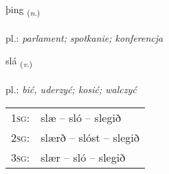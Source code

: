 \documentclass[frontgrid, backgrid]{flacards}\usepackage[]{graphicx}\usepackage[]{xcolor}
\begin{document}
\renewcommand{\flhead}{\vskip5pt \fboxsep=0pt {\small\bfseries\footnotesize Nafnorð | rzeczownik}}
\renewcommand{\fcfoot}{\vskip5pt \fboxsep=0pt \hspace{2pt}{\small\bfseries\footnotesize 1K}}

\renewcommand{\blhead}{\vskip5pt {\small\bfseries\footnotesize Nafnorð | rzeczownik }}
\renewcommand{\bcfoot}{\vskip5pt \hspace{2pt}{\small\bfseries\footnotesize 1K}}


{þing \small{\textsubscript{(\textit{n.})}} \\[1ex] %
\textphonetic{[θiŋk]} \\
pl.: \emph{parlament; spotkanie; konferencja} \\  [2ex]
\renewcommand*{\arraystretch}{0.8}
}

\renewcommand{\flhead}{\vskip5pt \fboxsep=0pt {\small\bfseries\footnotesize Sagnorð | czasownik}}
\renewcommand{\fcfoot}{\vskip5pt \fboxsep=0pt \hspace{2pt}{\small\bfseries\footnotesize 1K}}

\renewcommand{\blhead}{\vskip5pt {\small\bfseries\footnotesize Sagnorð | czasownik }}
\renewcommand{\bcfoot}{\vskip5pt \hspace{2pt}{\small\bfseries\footnotesize 1K}}


{slá \small{\textsubscript{(\textit{v.})}} \\[1ex] %
\textphonetic{[stlauː]} \\
pl.: \emph{bić, uderzyć; kosić; walczyć} \\  [2ex]
\renewcommand*{\arraystretch}{0.8}
\begin{tabular}{p{1cm}l}
\textsc{1sg}: & slæ -- sló -- slegið \\ 
\textsc{2sg}: & slærð -- slóst -- slegið \\ 
\textsc{3sg}: & slær -- sló -- slegið \\ 
\end{tabular}
}
\end{document}
